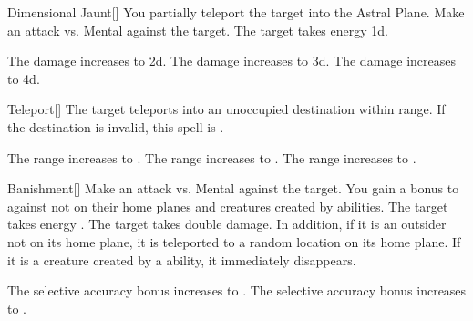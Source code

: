 \lowercase{\hypertarget{spell:Dimensional Jaunt}{}}\label{spell:Dimensional Jaunt}
\begin{freeability}[Rank 1]{\hypertarget{spell:Dimensional Jaunt}{Dimensional Jaunt}}[]
You partially teleport the target into the Astral Plane.
Make an attack vs. Mental against the target.
\hit The target takes energy  \plus1d.

\rankline
{} The damage increases to  \plus2d.
 The damage increases to  \plus3d.
 The damage increases to  \plus4d.
\end{freeability}
\vspace{0.25em}



\lowercase{\hypertarget{spell:Teleport}{}}\label{spell:Teleport}
\begin{freeability}[Rank 1]{\hypertarget{spell:Teleport}{Teleport}}[]
The target teleports into an unoccupied destination within range.
If the destination is invalid, this spell is .

\rankline
{} The range increases to \rngmed.
 The range increases to \rnglong.
 The range increases to \rngext.
\end{freeability}
\vspace{0.25em}



\lowercase{\hypertarget{spell:Banishment}{}}\label{spell:Banishment}
\begin{freeability}[Rank 3]{\hypertarget{spell:Banishment}{Banishment}}[]
Make an attack vs. Mental against the target.
You gain a  bonus to  against  not on their home planes and creatures created by  abilities.
\hit The target takes energy .
\crit The target takes double damage.
In addition, if it is an outsider not on its home plane, it is teleported to a random location on its home plane.
If it is a creature created by a  ability, it immediately disappears.

\rankline
{} The selective accuracy bonus increases to .
 The selective accuracy bonus increases to .
\end{freeability}
\vspace{0.25em}



